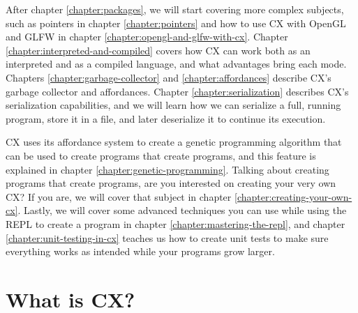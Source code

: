 \documentclass[11pt,fleqn,openany]{book} %
\begin{document}
After chapter \ref{chapter:packages}, we will start covering more complex subjects, such as pointers in chapter \ref{chapter:pointers} and how to use CX with OpenGL and GLFW in chapter \ref{chapter:opengl-and-glfw-with-cx}. Chapter \ref{chapter:interpreted-and-compiled} covers how CX can work both as an interpreted and as a compiled language, and what advantages bring each mode. Chapters \ref{chapter:garbage-collector} and \ref{chapter:affordances} describe CX's garbage collector and affordances.%
 Chapter \ref{chapter:serialization} describes CX's serialization capabilities, and we will learn how we can serialize a full, running program, store it in a file, and later deserialize it to continue its execution.

CX uses its affordance system to create a genetic programming algorithm that can be used to create programs that create programs, and this feature is explained in chapter \ref{chapter:genetic-programming}. Talking about creating programs that create programs, are you interested on creating your very own CX? If you are, we will cover that subject in chapter \ref{chapter:creating-your-own-cx}. Lastly, we will cover some advanced techniques you can use while using the REPL to create a program in chapter \ref{chapter:mastering-the-repl}, and chapter \ref{chapter:unit-testing-in-cx} teaches us how to create unit tests to make sure everything works as intended while your programs grow larger.


\section{What is CX?}

\end{document}
